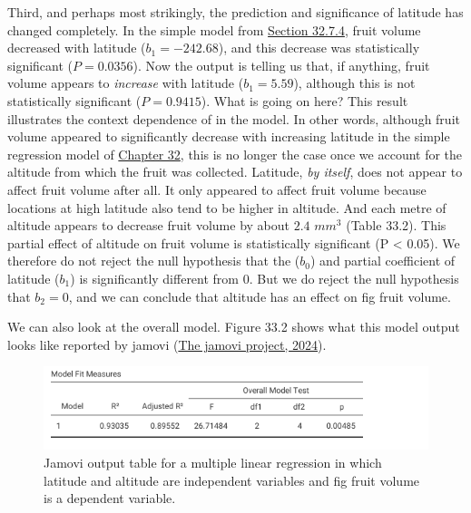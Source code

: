 \documentclass[
  openany]{krantz}
\begin{document}
Third, and perhaps most strikingly, the prediction and significance of latitude has changed completely.
In the simple  model from \protect\hyperlink{simple-regression-output}{Section 32.7.4}, fruit volume decreased with latitude (\(b_{1} = -242.68\)), and this decrease was statistically significant (\(P = 0.0356\)).
Now the  output is telling us that, if anything, fruit volume appears to \emph{increase} with latitude (\(b_{1} = 5.59\)), although this is not statistically significant (\(P = 0.9415\)).
What is going on here?
This result illustrates the context dependence of  in the  model.
In other words, although fruit volume appeared to significantly decrease with increasing latitude in the simple regression model of \protect\hyperlink{Chapter_32}{Chapter 32}, this is no longer the case once we account for the altitude from which the fruit was collected.
Latitude, \emph{by itself}, does not appear to affect fruit volume after all.
It only appeared to affect fruit volume because locations at high latitude also tend to be higher in altitude.
And each metre of altitude appears to decrease fruit volume by about \(2.4\) \(mm^{3}\) (Table 33.2).
This partial effect of altitude on fruit volume is statistically significant (P \textless{} 0.05).
We therefore do not reject the null hypothesis that the  (\(b_{0}\)) and partial coefficient of latitude (\(b_{1}\)) is significantly different from 0.
But we do reject the null hypothesis that \(b_{2} = 0\), and we can conclude that altitude has an effect on fig fruit volume.

We can also look at the overall  model.
Figure 33.2 shows what this model output looks like reported by jamovi (\protect\hyperlink{ref-Jamovi2022}{The jamovi project, 2024}).

\begin{figure}
\includegraphics[width=1\linewidth]{img/jamovi_overall_multiple_regression_output} \caption{Jamovi output table for a multiple linear regression in which latitude and altitude are independent variables and fig fruit volume is a dependent variable.}\label{fig:unnamed-chunk-153}
\end{figure}
\end{document}
